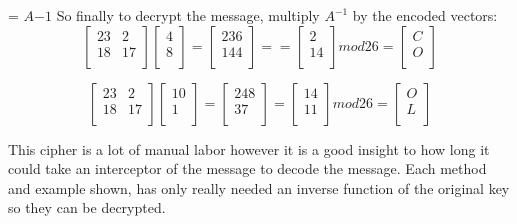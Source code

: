 \documentclass[12pt,letterpaper]{article} %
\begin{document}
= $A{-1}$
So finally to decrypt the message, multiply $A^{-1}$ by the encoded vectors:
\[\begin{bmatrix}
23&2\\
18&17\\
\end{bmatrix}
\begin{bmatrix}
4\\
8\\
\end{bmatrix}
=
\begin{bmatrix}
236\\
144\\
\end{bmatrix}
==
\begin{bmatrix}
2\\
14\\
\end{bmatrix}mod26
=
\begin{bmatrix}
C\\
O\\
\end{bmatrix}\]

\[\begin{bmatrix}
23&2\\
18&17\\
\end{bmatrix}
\begin{bmatrix}
10\\
1\\
\end{bmatrix}
=
\begin{bmatrix}
248\\
37\\
\end{bmatrix}
=
\begin{bmatrix}
14\\
11\\
\end{bmatrix}mod26
=
\begin{bmatrix}
O\\
L\\
\end{bmatrix}\]

This cipher is a lot of manual labor however it is a good insight to how long it could take an interceptor of the message to decode the message.
\newline
Each method and example shown, has only really needed an inverse function of the original key so they can be decrypted.  
\end{document}
